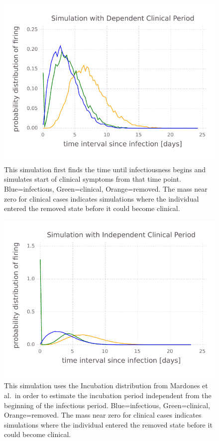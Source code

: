 \documentclass{article}
\begin{document}
\begin{figure}
\centerline{\includegraphics{SimulationwithDependentClinicalPeriod}}
\caption{This simulation first finds the time until
infectiousness begins and simulates start of clinical symptoms
from that time point.
Blue=infectious, Green=clinical, Orange=removed. The mass near
zero for clinical cases indicates simulations where the individual
entered the removed state before it could become clinical.
\label{fig:depclinicalindividual}}
\end{figure}
\begin{figure}
\centerline{\includegraphics{SimulationwithIndependentClinicalPeriod}}
\caption{This simulation uses the Incubation distribution from
Mardones et al.\ in order to estimate the incubation period
independent from the beginning of the infectious period.
Blue=infectious, Green=clinical, Orange=removed. The mass near
zero for clinical cases indicates simulations where the individual
entered the removed state before it could become clinical.
\label{fig:indepclinicalindividual}}
\end{figure}
\end{document}
